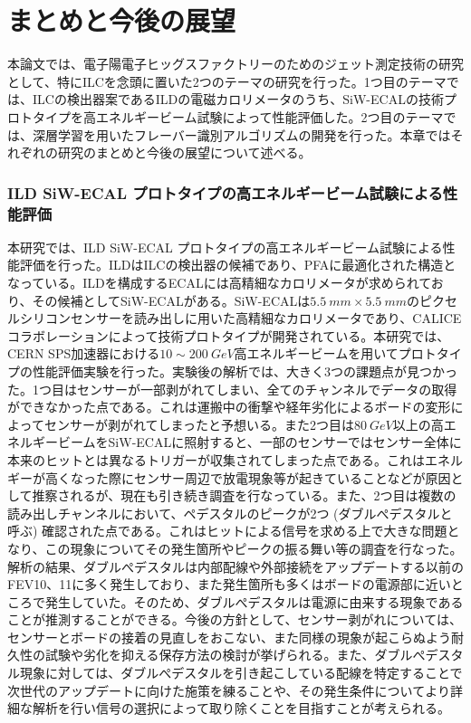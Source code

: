 
\chapter{まとめと今後の展望} \label{sec:Conclusion}
本論文では、電子陽電子ヒッグスファクトリーのためのジェット測定技術の研究として、特にILCを念頭に置いた2つのテーマの研究を行った。1つ目のテーマでは、ILCの検出器案であるILDの電磁カロリメータのうち、SiW-ECALの技術プロトタイプを高エネルギービーム試験によって性能評価した。2つ目のテーマでは、深層学習を用いたフレーバー識別アルゴリズムの開発を行った。本章ではそれぞれの研究のまとめと今後の展望について述べる。

\subsection*{ILD SiW-ECAL プロトタイプの高エネルギービーム試験による性能評価}
本研究では、ILD SiW-ECAL プロトタイプの高エネルギービーム試験による性能評価を行った。ILDはILCの検出器の候補であり、PFAに最適化された構造となっている。ILDを構成するECALには高精細なカロリメータが求められており、その候補としてSiW-ECALがある。SiW-ECALは$\SI{5.5}{mm} \times \SI{5.5}{mm}$のピクセルシリコンセンサーを読み出しに用いた高精細なカロリメータであり、CALICEコラボレーションによって技術プロトタイプが開発されている。本研究では、CERN SPS加速器における$10 \sim \SI{200}{GeV}$高エネルギービームを用いてプロトタイプの性能評価実験を行った。実験後の解析では、大きく3つの課題点が見つかった。1つ目はセンサーが一部剥がれてしまい、全てのチャンネルでデータの取得ができなかった点である。これは運搬中の衝撃や経年劣化によるボードの変形によってセンサーが剥がれてしまったと予想いる。また2つ目は$\SI{80}{GeV}$以上の高エネルギービームをSiW-ECALに照射すると、一部のセンサーではセンサー全体に本来のヒットとは異なるトリガーが収集されてしまった点である。これはエネルギーが高くなった際にセンサー周辺で放電現象等が起きていることなどが原因として推察されるが、現在も引き続き調査を行なっている。また、2つ目は複数の読み出しチャンネルにおいて、ペデスタルのピークが2つ (ダブルぺデスタルと呼ぶ) 確認された点である。これはヒットによる信号を求める上で大きな問題となり、この現象についてその発生箇所やピークの振る舞い等の調査を行なった。解析の結果、ダブルぺデスタルは内部配線や外部接続をアップデートする以前のFEV10、11に多く発生しており、また発生箇所も多くはボードの電源部に近いところで発生していた。そのため、ダブルぺデスタルは電源に由来する現象であることが推測することができる。今後の方針として、センサー剥がれについては、センサーとボードの接着の見直しをおこない、また同様の現象が起こらぬよう耐久性の試験や劣化を抑える保存方法の検討が挙げられる。また、ダブルぺデスタル現象に対しては、ダブルぺデスタルを引き起こしている配線を特定することで次世代のアップデートに向けた施策を練ることや、その発生条件についてより詳細な解析を行い信号の選択によって取り除くことを目指すことが考えられる。

